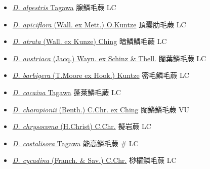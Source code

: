 \begin{itemize}
  \begin{itemize}
        \item[] \href{http://www.theplantlist.org/tpl1.1/search?q=Dryopteris+alpestris}{\textit{D. alpestris} Tagawa}   腺鱗毛蕨   LC
        \item[] \href{http://www.theplantlist.org/tpl1.1/search?q=Dryopteris+apiciflora}{\textit{D. apiciflora} (Wall. ex Mett.) O.Kuntze}   頂囊肋毛蕨   LC
        \item[] \href{http://www.theplantlist.org/tpl1.1/search?q=Dryopteris+atrata}{\textit{D. atrata} (Wall. ex Kunze) Ching}   暗鱗鱗毛蕨   LC
        \item[] \href{http://www.theplantlist.org/tpl1.1/search?q=Dryopteris+austriaca}{\textit{D. austriaca} (Jacq.) Wayn. ex Schinz \& Thell.}   闊葉鱗毛蕨   LC
        \item[] \href{http://www.theplantlist.org/tpl1.1/search?q=Dryopteris+barbigera}{\textit{D. barbigera} (T.Moore ex Hook.) Kuntze}   密毛鱗毛蕨   LC
        \item[] \href{http://www.theplantlist.org/tpl1.1/search?q=Dryopteris+cacaina}{\textit{D. cacaina} Tagawa}   蓬萊鱗毛蕨   LC
        \item[] \href{http://www.theplantlist.org/tpl1.1/search?q=Dryopteris+championii}{\textit{D. championii} (Benth.) C.Chr. ex Ching}   闊鱗鱗毛蕨   VU
        \item[] \href{http://www.theplantlist.org/tpl1.1/search?q=Dryopteris+chrysocoma}{\textit{D. chrysocoma} (H.Christ) C.Chr.}   擬岩蕨   LC
        \item[] \href{http://www.theplantlist.org/tpl1.1/search?q=Dryopteris+costalisora}{\textit{D. costalisora} Tagawa}   能高鱗毛蕨  \# LC
        \item[] \href{http://www.theplantlist.org/tpl1.1/search?q=Dryopteris+cycadina}{\textit{D. cycadina} (Franch. \& Sav.) C.Chr.}   桫欏鱗毛蕨   LC

\end{itemize}
\end{itemize}
